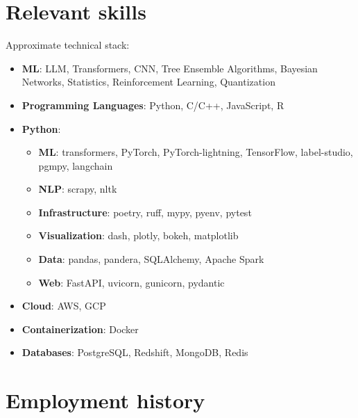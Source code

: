 \documentclass[10pt,a4paper]{article}
\newcommand{\verticalSpace}{0.3cm}
\begin{document}
	
	\section*{Relevant skills}
Approximate technical stack: 
\begin{itemize}
    \item \textbf{ML}: LLM, Transformers, CNN, Tree Ensemble Algorithms, Bayesian Networks, Statistics, Reinforcement Learning, Quantization
    
    \item \textbf{Programming Languages}: Python, C/C++, JavaScript, R
    \item \textbf{Python}:
        \begin{itemize}
            \item \textbf{ML}: transformers, PyTorch, PyTorch-lightning, TensorFlow, label-studio, pgmpy, langchain
            \item \textbf{NLP}: scrapy, nltk
            \item \textbf{Infrastructure}: poetry, ruff, mypy, pyenv, pytest
            \item \textbf{Visualization}: dash, plotly, bokeh, matplotlib
            \item \textbf{Data}: pandas, pandera, SQLAlchemy, Apache Spark
            \item \textbf{Web}: FastAPI, uvicorn, gunicorn, pydantic
        \end{itemize}
    \item \textbf{Cloud}: AWS, GCP
    \item \textbf{Containerization}: Docker
    \item \textbf{Databases}: PostgreSQL, Redshift, MongoDB, Redis
    
\end{itemize}
	\setlength{\parindent}{3em}


	

\newpage


	\setlength{\parindent}{0em}
	\vspace{\verticalSpace}
	\section*{Employment history}
\end{document}
